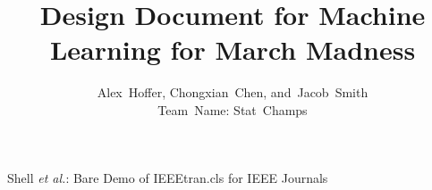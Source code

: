 \documentclass[journal,onecolumn]{IEEEtran}
\begin{document}
%
\title{Design Document for Machine Learning for March Madness}
%
%
%

\author{Alex~Hoffer,
        Chongxian~Chen,
        and~Jacob~Smith\\Team~Name: Stat~Champs}%


% 
%



%
{Shell \MakeLowercase{\textit{et al.}}: Bare Demo of IEEEtran.cls for IEEE Journals}
% 
\end{document}
